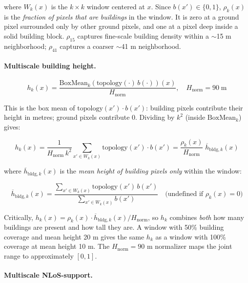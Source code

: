 where $W_k(x)$ is the $k\times k$ window centered at $x$.
Since $b(x') \in \{0,1\}$, $\rho_k(x)$ is the \emph{fraction of pixels
that are buildings} in the window. It is zero at a ground pixel
surrounded only by other ground pixels, and one at a pixel deep inside a
solid building block. $\rho_{15}$ captures fine-scale building density within
a $\sim$15 m neighborhood; $\rho_{41}$ captures a coarser $\sim$41 m
neighborhood.

\paragraph{Multiscale building height.}

\begin{equation}
h_k(x)=
\frac{\mathrm{BoxMean}_k\!\left(\mathrm{topology}(\cdot)\,b(\cdot)\right)(x)}
{H_{\mathrm{norm}}},
\quad H_{\mathrm{norm}} = 90 \;\mathrm{m}
\label{eq:h_k}
\end{equation}

This is the box mean of $\mathrm{topology}(x')\cdot b(x')$:
building pixels contribute their height in metres; ground pixels contribute
0. Dividing by $k^2$ (inside $\mathrm{BoxMean}_k$) gives:

\begin{equation}
h_k(x)=
\frac{1}{H_{\mathrm{norm}}\,k^2}
\sum_{x'\in W_k(x)}
\mathrm{topology}(x')\cdot b(x')
=
\frac{\rho_k(x)}{H_{\mathrm{norm}}}\;\overline{h}_{\mathrm{bldg},k}(x)
\label{eq:h_k_interp}
\end{equation}

where $\overline{h}_{\mathrm{bldg},k}(x)$ is the \emph{mean height of
building pixels only} within the window:

\begin{equation}
\overline{h}_{\mathrm{bldg},k}(x)
=
\frac{\displaystyle\sum_{x'\in W_k(x)} \mathrm{topology}(x')\,b(x')}
     {\displaystyle\sum_{x'\in W_k(x)} b(x')}
\quad\text{(undefined if }\rho_k(x)=0\text{)}
\label{eq:mean_bldg_height}
\end{equation}

Critically, $h_k(x) = \rho_k(x)\cdot\overline{h}_{\mathrm{bldg},k}(x)/H_{\mathrm{norm}}$,
so $h_k$ combines \emph{both} how many buildings are present and how tall they
are. A window with 50\% building coverage and mean height 20 m gives the same
$h_k$ as a window with 100\% coverage at mean height 10 m. The $H_{\mathrm{norm}}
= 90$ m normalizer maps the joint range to approximately $[0, 1]$.

\paragraph{Multiscale NLoS-support.}

